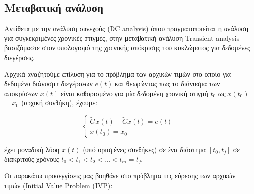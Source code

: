 \subsection{Μεταβατική ανάλυση}

Αντίθετα με την ανάλυση συνεχούς (\textlatin{DC analysis}) όπου πραγματοποιείται η ανάλυση για συγκεκριμένες χρονικές στιγμές, στην μεταβατική ανάλυση \textlatin{Transient analysis} βασιζόμαστε στον υπολογισμό της χρονικής απόκρισης του κυκλώματος για δεδομένες διεγέρσεις.


Αρχικά αναζητούμε επίλυση για το πρόβλημα των αρχικών τιμών στο οποίο για δεδομένο διάνυσμα διεγέρσεων ${e}(t)$ και θεωρώντας πως το διάνυσμα των αποκρίσεων ${x}(t)$ είναι καθορισμένο για μία δεδομένη χρονική στιγμή $t_0$ ως ${x}(t_0)$ = ${x_0}$ (αρχική συνθήκη),
έχουμε:

\[
\begin{cases}
    \widetilde{G} {x}(t) + \widetilde{C}\dot{{x}}(t) = {e}(t) \\
     {x}(t_0) = {x_0}
\end{cases}
\]

έχει μοναδική λύση ${x}(t)$ (υπό ορισμένες συνθήκες) σε ένα διάστημα $[t_0 , t_f]$ σε διακριτούς χρόνους $t_0 < t_1 < t_2 < ... < t_m = t_f$.




Οι παρακάτω προσεγγίσεις μας βοηθάνε στο πρόβλημα της εύρεσης των αρχικών τιμών (\textlatin{Initial Value Problem (IVP)}:


